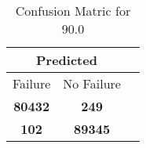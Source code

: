 \begin{table}[] 
\caption{Confusion Matric for 90.0} 
\label{Table: Prediction Accuracy-DMD90.0OnlySunEKF-ignoreReflectionEKF-top2perfectNoFailurePrediction-Reflection} 
\centering 
\begin{tabular} 
 {@{}ccc@{}} 
\toprule 
\multicolumn{2}{c}{\textbf{Predicted}}
 \\ \midrule 
\multicolumn{1}{|c|}{Failure} & 
\multicolumn{1}{c|}{No Failure}
 \\ \midrule 
\multicolumn{1}{|c|}{\color{green}\textbf{80432}} & 
\multicolumn{1}{c|}{\color{red}\textbf{249}}
 \\ \midrule 
\multicolumn{1}{|c|}{\color{red}\textbf{102}} & 
\multicolumn{1}{c|}{\color{green}\textbf{89345}}
 \\ \bottomrule 
\end{tabular} 
\end{table} 
